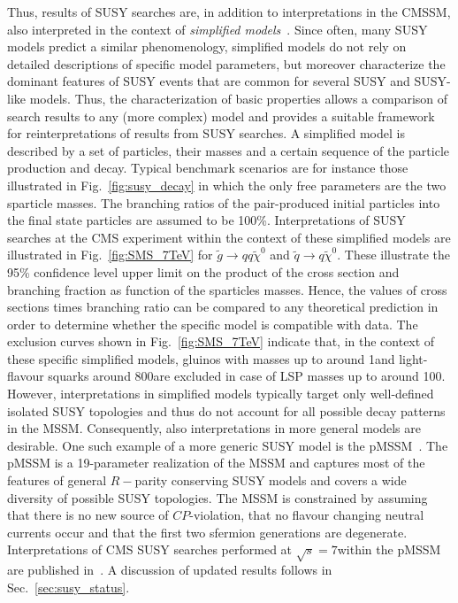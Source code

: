 Thus, results of SUSY searches are, in addition to interpretations in the CMSSM, also interpreted in the context of \textit{simplified models}~\cite{ArkaniHamed:2007fw, Alwall:2008ag, Alwall:2008va, Chatrchyan:2013sza}. Since often, many SUSY models predict a similar phenomenology, simplified models do not rely on detailed descriptions of specific model parameters, but moreover characterize the dominant features of SUSY events that are common for several SUSY and SUSY-like models. Thus, the characterization of basic properties allows a comparison of search results to any (more complex) model and provides a suitable framework for reinterpretations of results from SUSY searches. A simplified model is described by a set of particles, their masses and a certain sequence of the particle production and decay. Typical benchmark scenarios are for instance those illustrated in Fig.~\ref{fig:susy_decay} in which the only free parameters are the two sparticle masses. The branching ratios of the pair-produced initial particles into the final state particles are assumed to be 100\%. Interpretations of SUSY searches at the CMS experiment within the context of these simplified models are illustrated in Fig.~\ref{fig:SMS_7TeV} for $\tilde{g} \rightarrow qq\tilde{\chi}^0$ and $\tilde{q} \rightarrow q \tilde{\chi}^0$. These illustrate the 95\% confidence level upper limit on the product of the cross section and branching fraction as function of the sparticles masses. Hence, the values of cross sections times branching ratio can be compared to any theoretical prediction in order to determine whether the specific model is compatible with data. The exclusion curves shown in Fig.~\ref{fig:SMS_7TeV} indicate that, in the context of these specific simplified models, gluinos with masses up to around 1\tev and light-flavour squarks around 800\gev are excluded in case of LSP masses up to around 100\gev. \\
However, interpretations in simplified models typically target only well-defined isolated SUSY topologies and thus do not account for all possible decay patterns in the MSSM. Consequently, also interpretations in more general models are desirable. One such example of a more generic SUSY model is the pMSSM~\cite{Djouadi:1998di}. The pMSSM is a 19-parameter realization of the MSSM and captures most of the features of general $R-$parity conserving SUSY models and covers a wide diversity of possible SUSY topologies. The MSSM is constrained by assuming that there is no new source of $CP$-violation, that no flavour changing neutral currents occur and that the first two sfermion generations are degenerate. Interpretations of CMS SUSY searches performed at $\sqrt{s} = 7$\tev within the pMSSM are published in~\cite{CMS-PAS-SUS-12-030}. A discussion of updated results follows in Sec.~\ref{sec:susy_status}.
